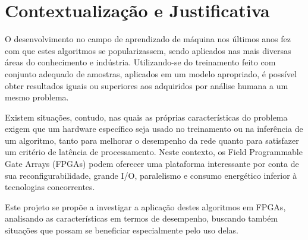 \documentclass[
	12pt,				%
	oneside,			%
	a4paper,			%
	english,			%
	french,				%
	spanish,			%
	brazil,				%
	]{abntex2}
\begin{document}

\frenchspacing


\imprimircapa

\imprimirfolhaderosto




\textual


\chapter*[Contextualização e Justificativa]{Contextualização e Justificativa}
O desenvolvimento no campo de aprendizado de máquina nos últimos anos
fez com que estes algoritmos se popularizassem, sendo aplicados nas mais
diversas áreas do conhecimento e indústria. Utilizando-se do treinamento
feito com conjunto adequado de amostras, aplicados em um modelo
apropriado, é possível obter resultados iguais ou superiores aos
adquiridos por análise humana a um mesmo problema.

Existem situações, contudo, nas quais as próprias características do
problema exigem que um hardware específico seja usado no treinamento ou
na inferência de um algoritmo, tanto para melhorar o desempenho da rede
quanto para satisfazer um critério de latência de processamento. Neste
contexto, os Field Programmable Gate Arrays (FPGAs) podem oferecer uma
plataforma interessante por conta de sua reconfigurabilidade, grande
I/O, paralelismo e consumo energético inferior à tecnologias
concorrentes.

Este projeto se propõe a investigar a aplicação destes algoritmos em
FPGAs, analisando as características em termos de desempenho, buscando
também situações que possam se beneficiar especialmente pelo uso delas.
\end{document}
